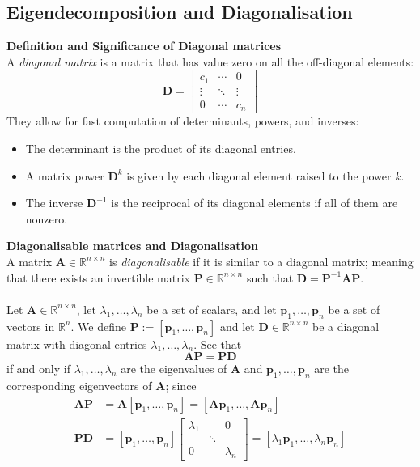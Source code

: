 \documentclass{report}
\begin{document}
\subsection{Eigendecomposition and Diagonalisation}
\textbf{Definition and Significance of Diagonal matrices}\\
A \textit{diagonal matrix} is a matrix that has value zero on all the off-diagonal elements:
\begin{equation*}
\bm{D}=\begin{bmatrix}
c_1&\cdots&0\\
\vdots&\ddots&\vdots\\
0&\cdots&c_n
\end{bmatrix}
\end{equation*}
They allow for fast computation of determinants, powers, and inverses:
\begin{itemize}
\item The determinant is the product of its diagonal entries.
\item A matrix power $\bm{D}^k$ is given by each diagonal element raised to the power $k$.
\item The inverse $\bm{D}^{-1}$ is the reciprocal of its diagonal elements if all of them are nonzero.
\end{itemize}
\textbf{Diagonalisable matrices and Diagonalisation}\\
A matrix $\bm{A}\in\mathbb{R}^{n\times n}$ is \textit{diagonalisable} if it is similar to a diagonal matrix;
meaning that there exists an invertible matrix $\bm{P}\in\mathbb{R}^{n\times n}$ such that
$\bm{D}=\bm{P}^{-1}\bm{AP}$.\\
\vspace{1mm}\\
Let $\bm{A}\in\mathbb{R}^{n\times n}$, let $\lambda_1,\ldots,\lambda_n$ be a set of scalars,
and let $\bm{p}_1,\ldots,\bm{p}_n$ be a set of vectors in $\mathbb{R}^n$. We define 
$\bm{P}:=[\bm{p}_1,\ldots,\bm{p}_n]$ and let $\bm{D}\in\mathbb{R}^{n\times n}$ be a diagonal matrix with
diagonal entries $\lambda_1,\ldots,\lambda_n$. See that
\begin{equation*}
\bm{AP}=\bm{PD}
\end{equation*}
if and only if $\lambda_1,\ldots,\lambda_n$ are the eigenvalues of $\bm{A}$ and $\bm{p}_1,\ldots,\bm{p}_n$ are the 
corresponding eigenvectors of $\bm{A}$; since
\begin{align*}
\bm{AP}&=\bm{A}[\bm{p}_1,\ldots,\bm{p}_n]=[\bm{A}\bm{p}_1,\ldots,\bm{A}\bm{p}_n]\\
\bm{PD}&=[\bm{p}_1,\ldots,\bm{p}_n]\begin{bmatrix}
\lambda_1&&0\\&\ddots&\\0&&\lambda_n\end{bmatrix}=
[\lambda_1\bm{p}_1,\ldots,\lambda_n\bm{p}_n]
\end{align*}
\end{document}

